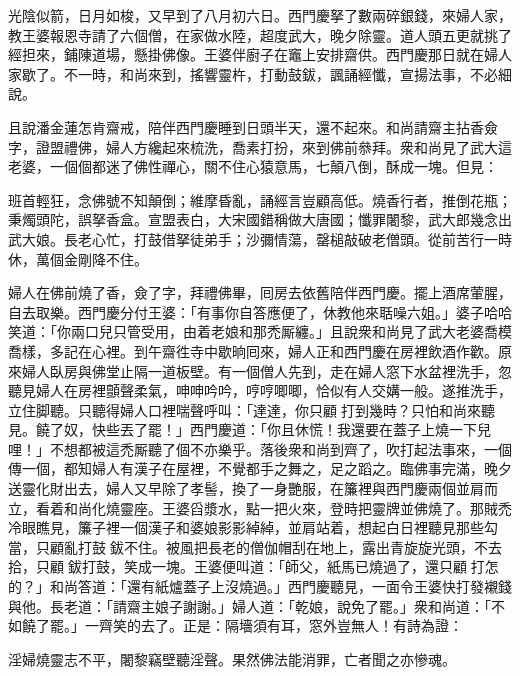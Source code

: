 光陰似箭，日月如梭，又早到了八月初六日。西門慶拏了數兩碎銀錢，來婦人家，教王婆報恩寺請了六個僧，在家做水陸，超度武大，晚夕除靈。道人頭五更就挑了經担來，鋪陳道場，懸掛佛像。王婆伴廚子在竈上安排齋供。西門慶那日就在婦人家歇了。不一時，和尚來到，搖響靈杵，打動鼓鈸，諷誦經懺，宣揚法事，不必細說。

且說潘金蓮怎肯齋戒，陪伴西門慶睡到日頭半天，還不起來。和尚請齋主拈香僉字，證盟禮佛，婦人方纔起來梳洗，喬素打扮，來到佛前叅拜。衆和尚見了武大這老婆，一個個都迷了佛性禪心，關不住心猿意馬，七顛八倒，酥成一塊。但見：

\begin{myquote} 
班首輕狂，念佛號不知顛倒；維摩昏亂，誦經言豈顧高低。燒香行者，推倒花瓶；秉燭頭陀，誤拏香盒。宣盟表白，大宋國錯稱做大唐國；懺罪闍黎，武大郎幾念出武大娘。長老心忙，打鼓借拏徒弟手；沙彌情蕩，罄槌敲破老僧頭。從前苦行一時休，萬個金剛降不住。
\end{myquote} 

婦人在佛前燒了香，僉了字，拜禮佛畢，囘房去依舊陪伴西門慶。擺上酒席葷腥，自去取樂。西門慶分付王婆：「有事你自答應便了，休教他來聒噪六姐。」婆子哈哈笑道：「你兩口兒只管受用，由着老娘和那禿厮纏。」{}且說衆和尚見了武大老婆喬模喬樣，多記在心裡。到午齋徃寺中歇晌囘來，婦人正和西門慶在房裡飲酒作歡。原來婦人臥房與佛堂止隔一道板壁。有一個僧人先到，走在婦人窓下水盆裡洗手，忽聽見婦人在房裡顫聲柔氣，呻呻吟吟，哼哼唧唧，恰似有人交媾一般。遂推洗手，立住脚聽。{}{}只聽得婦人口裡喘聲呼叫：「達達，你只顧𢵞打到幾時？只怕和尚來聽見。饒了奴，快些丟了罷！」西門慶道：「你且休慌！我還要在蓋子上燒一下兒哩！」不想都被這禿厮聽了個不亦樂乎。落後衆和尚到齊了，吹打起法事來，一個傳一個，都知婦人有漢子在屋裡，不覺都手之舞之，足之蹈之。臨佛事完滿，晚夕送靈化財出去，婦人又早除了孝髻，換了一身艷服，在簾裡與西門慶兩個並肩而立，看着和尚化燒靈座。王婆舀漿水，點一把火來，登時把靈牌並佛燒了。那賊禿冷眼瞧見，簾子裡一個漢子和婆娘影影綽綽，並肩站着，想起白日裡聽見那些勾當，只顧亂打鼓𢵞鈸不住。被風把長老的僧伽帽刮在地上，露出青旋旋光頭，不去拾，只顧𢵞鈸打鼓，笑成一塊。{}王婆便叫道：「師父，紙馬已燒過了，還只顧𢵞打怎的？」和尚答道：「還有紙爐蓋子上沒燒過。」西門慶聽見，一面令王婆快打發襯錢與他。長老道：「請齋主娘子謝謝。」婦人道：「乾娘，說免了罷。」衆和尚道：「不如饒了罷。」一齊笑的去了。正是：隔墻須有耳，窓外豈無人！有詩為證：

\begin{myquote} 
淫婦燒靈志不平，闍黎竊壁聽淫聲。果然佛法能消罪，亡者聞之亦慘魂。
\end{myquote} 

